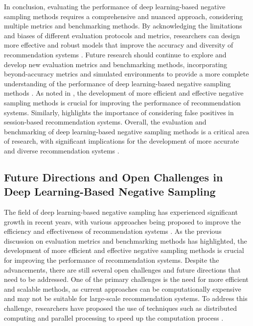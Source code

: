 \documentclass[11pt,a4paper]{article}
\begin{document}
In conclusion, evaluating the performance of deep learning-based negative sampling methods requires a comprehensive and nuanced approach, considering multiple metrics and benchmarking methods. By acknowledging the limitations and biases of different evaluation protocols and metrics, researchers can design more effective and robust models that improve the accuracy and diversity of recommendation systems \cite{doi:10.1145/3589334.3645625}. Future research should continue to explore and develop new evaluation metrics and benchmarking methods, incorporating beyond-accuracy metrics and simulated environments to provide a more complete understanding of the performance of deep learning-based negative sampling methods \cite{doi:10.1145/3511808.3557713}. As noted in \cite{doi:10.1145/3331184.3331337}, the development of more efficient and effective negative sampling methods is crucial for improving the performance of recommendation systems. Similarly, \cite{doi:10.1609/aaai.v36i4.20321} highlights the importance of considering false positives in session-based recommendation systems. Overall, the evaluation and benchmarking of deep learning-based negative sampling methods is a critical area of research, with significant implications for the development of more accurate and diverse recommendation systems \cite{doi:10.1145/3460231.3475943}.


\subsection{Future Directions and Open Challenges in Deep Learning-Based Negative Sampling}


The field of deep learning-based negative sampling has experienced significant growth in recent years, with various approaches being proposed to improve the efficiency and effectiveness of recommendation systems \cite{doi:10.1609/aaai.v34i01.5329}. As the previous discussion on evaluation metrics and benchmarking methods has highlighted, the development of more efficient and effective negative sampling methods is crucial for improving the performance of recommendation systems. Despite the advancements, there are still several open challenges and future directions that need to be addressed. One of the primary challenges is the need for more efficient and scalable methods, as current approaches can be computationally expensive and may not be suitable for large-scale recommendation systems. To address this challenge, researchers have proposed the use of techniques such as distributed computing and parallel processing to speed up the computation process \cite{doi:10.1145/3583780.3614965}.
\end{document}
